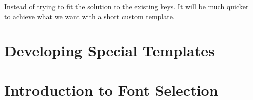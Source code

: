  Instead of trying to fit the solution to the existing keys. It will be much quicker to achieve what we want with a short custom template.
 \bigskip
 

 \makeatletter\@specialtrue\makeatother
            
\chapter{Developing  Special Templates}           
           
\chapter{Introduction to Font Selection} 
 
\def\koran{\scalebox{.5}{\vbox{{\raggedleft\arial\setRTL

ِسْمِ اللَّهِ الرَّحْمَٰنِ الرَّحِيمِ

الْحَمْدُ لِلَّهِ رَبِّ الْعَالَمِينَ



الرَّحْمَٰنِ الرَّحِيمِ

مَالِكِ يَوْمِ الدِّينِ

إِيَّاكَ نَعْبُدُ وَإِيَّاكَ نَسْتَعِينُ

اهْدِنَا الصِّرَاطَ الْمُسْتَقِيمَ

صِرَاطَ الَّذِينَ أَنْعَمْتَ عَلَيْهِمْ غَيْرِ الْمَغْضُوبِ عَلَيْهِمْ وَلَا الضَّالِّينَ

بِسْمِ اللَّهِ الرَّحْمَٰنِ الرَّحِيمِ الم

ذَٰلِكَ الْكِتَابُ لَا رَيْبَ ۛ فِيهِ ۛ هُدًى لِلْمُتَّقِينَ

الَّذِينَ يُؤْمِنُونَ بِالْغَيْبِ وَيُقِيمُونَ الصَّلَاةَ وَمِمَّا رَزَقْنَاهُمْ يُنْفِقُونَ

وَالَّذِينَ يُؤْمِنُونَ بِمَا أُنْزِلَ إِلَيْكَ وَمَا أُنْزِلَ مِنْ قَبْلِكَ وَبِالْآخِرَةِ هُمْ يُوقِنُونَ

أُولَٰئِكَ عَلَىٰ هُدًى مِنْ رَبِّهِمْ ۖ وَأُولَٰئِكَ هُمُ الْمُفْلِحُونَ

إِنَّ الَّذِينَ كَفَرُوا سَوَاءٌ عَلَيْهِمْ أَأَنْذَرْتَهُمْ أَمْ لَمْ تُنْذِرْهُمْ لَا يُؤْمِنُونَ

خَتَمَ اللَّهُ عَلَىٰ قُلُوبِهِمْ وَعَلَىٰ سَمْعِهِمْ ۖ وَعَلَىٰ أَبْصَارِهِمْ غِشَاوَةٌ ۖ وَلَهُمْ عَذَابٌ عَظِيمٌ

وَمِنَ النَّاسِ مَنْ يَقُولُ آمَنَّا بِاللَّهِ وَبِالْيَوْمِ الْآخِرِ وَمَا هُمْ بِمُؤْمِنِينَ

يُخَادِعُونَ اللَّهَ وَالَّذِينَ آمَنُوا وَمَا يَخْدَعُونَ إِلَّا أَنْفُسَهُمْ وَمَا يَشْعُرُونَ

}}}}
